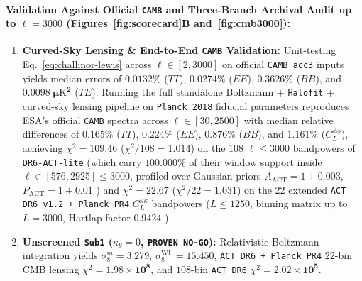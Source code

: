 \documentclass[11pt,a4paper]{article}
\begin{document}
\paragraph{Validation Against Official \texttt{CAMB} and Three-Branch Archival Audit up to $\ell = 3000$ (Figures~\ref{fig:scorecard}B and~\ref{fig:cmb3000}):}
\begin{enumerate}
  \item \textbf{Curved-Sky Lensing \& End-to-End \texttt{CAMB} Validation:} Unit-testing Eq.~\eqref{eq:challinor-lewis} across $\ell \in [2, 3000]$ on official \texttt{CAMB acc3} inputs yields median errors of $\mathbf{0.0132\%}$ ($TT$), $\mathbf{0.0274\%}$ ($EE$), $\mathbf{0.3626\%}$ ($BB$), and $\mathbf{0.0098\;\mu\mathrm{K}^2}$ ($TE$). Running the full standalone Boltzmann + \texttt{Halofit} + curved-sky lensing pipeline on \texttt{Planck 2018} fiducial parameters reproduces ESA's official \texttt{CAMB} spectra across $\ell \in [30, 2500]$ with median relative differences of $\mathbf{0.165\%}$ ($TT$), $\mathbf{0.224\%}$ ($EE$), $\mathbf{0.876\%}$ ($BB$), and $\mathbf{1.161\%}$ ($C_L^{\phi\phi}$), achieving $\chi^2 = \mathbf{109.46}$ ($\chi^2/108 = \mathbf{1.014}$) on the $108$ $\ell \le 3000$ bandpowers of {\upshape\texttt{DR6-ACT-lite}} (which carry $100.000\%$ of their window support inside $\ell \in [576, 2925] \le 3000$, profiled over Gaussian priors $A_{\mathrm{ACT}} = 1 \pm 0.003$, $P_{\mathrm{ACT}} = 1 \pm 0.01$ \cite{ACTDR6_Louis2025}) and $\chi^2 = \mathbf{22.67}$ ($\chi^2/22 = \mathbf{1.031}$) on the $22$ extended {\upshape\texttt{ACT DR6 v1.2 + Planck PR4}} $C_L^{\kappa\kappa}$ bandpowers ($L \le 1250$, binning matrix up to $L = 3000$, Hartlap factor $0.9424$ \cite{ACTDR6_Qu2024,Carron2022PR4Lensing}).
  \item \textbf{Unscreened {\upshape\texttt{Sub1}} ($\kappa_\theta = 0$, {\upshape\texttt{PROVEN NO-GO}}):} Relativistic Boltzmann integration yields $\sigma_8^m = \mathbf{3.279}$, $\sigma_8^{\mathrm{WL}} = \mathbf{15.450}$, {\upshape\texttt{ACT DR6 + Planck PR4}} $22$-bin CMB lensing $\chi^2 = \mathbf{1.98\times 10^8}$, and $108$-bin {\upshape\texttt{ACT DR6}} $\chi^2 = \mathbf{2.02\times 10^5}$.

\end{enumerate}
\end{document}

